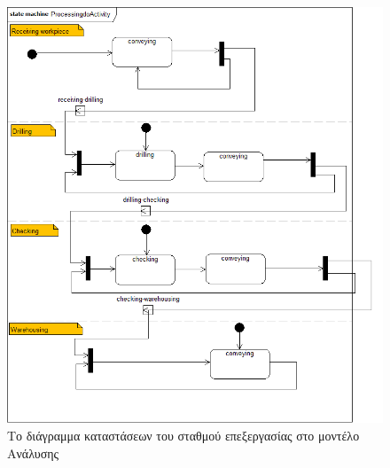 \documentclass[a4paper,12pt,twoside]{report}
\begin{document}
{\begin{appendices}
			\begin{figure}[hp]
					\centering
					\includegraphics[scale=0.30]{AnalysisModel_stm-ProcessingStation(Processingstate).png}
					\caption{Το διάγραμμα καταστάσεων του σταθμού επεξεργασίας στο μοντέλο Ανάλυσης}
					\label{φωτ:Το διάγραμμα καταστάσεων του σταθμού επεξεργασίας στο μοντέλο Ανάλυσης}
			\end{figure}
			

\end{appendices}}
\end{document}
